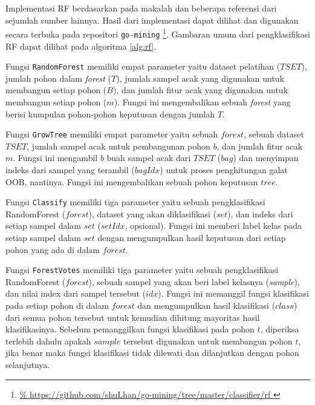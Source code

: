 Implementasi RF berdasarkan pada makalah \textcite{breiman2001random}
dan beberapa referensi dari sejumlah sumber lainnya.
Hasil dari implementasi dapat dilihat dan digunakan secara terbuka pada
repositori \texttt{go-mining}
\footnote{
\url{%
https://github.com/shuLhan/go-mining/tree/master/classifier/rf
}}.
Gambaran umum dari pengklasifikasi RF dapat dilihat pada algoritma
\ref{alg:rf}.

	

Fungsi \texttt{RandomForest} memiliki empat parameter yaitu dataset pelatihan
($TSET$),
jumlah pohon dalam \textit{forest} ($T$), jumlah sampel acak yang digunakan untuk
membangun setiap pohon ($B$), dan jumlah fitur acak yang digunakan untuk membangun
setiap pohon ($m$).
Fungsi ini mengembalikan sebuah \textit{forest} yang berisi kumpulan
pohon-pohon keputusan dengan jumlah $T$.

Fungsi \texttt{GrowTree} memiliki empat parameter yaitu sebuah $forest$, sebuah
dataset $TSET$, jumlah sampel acak untuk pembangunan pohon $b$, dan jumlah
fitur acak $m$.
Fungsi ini mengambil $b$ buah sampel acak dari $TSET$ ($bag$) dan menyimpan
indeks dari sampel yang terambil ($bagIdx$) untuk proses penghitungan galat
OOB, nantinya.
Fungsi ini mengembalikan sebuah pohon keputusan $tree$.

Fungsi \texttt{Classify} memiliki tiga parameter yaitu sebuah pengklasifikasi
RandomForest ($forest$), dataset yang akan diklasifikasi ($set$), dan indeks
dari setiap sampel dalam $set$ ($setIdx$, opsional).
Fungsi ini memberi label kelas pada setiap sampel dalam $set$ dengan
mengumpulkan hasil keputusan dari setiap pohon yang ada di dalam $forest$.

Fungsi \texttt{ForestVotes} memiliki tiga parameter yaitu sebuah
pengklasifikasi RandomForest ($forest$), sebuah sampel yang akan beri label
kelasnya (\textit{sample}), dan nilai index dari sampel tersebut ($idx$).
Fungsi ini memanggil fungsi klasifikasi pada setiap pohon di dalam $forest$ dan
mengumpulkan hasil klasifikasi ($class$) dari semua pohon tersebut untuk
kemudian dihitung mayoritas hasil klasifikasinya.
Sebelum pemanggilkan fungsi klasifikasi pada pohon $t$, diperiksa terlebih
dahulu apakah $sample$ tersebut digunakan untuk membangun pohon $t$, jika benar
maka fungsi klasifikasi tidak dilewati dan dilanjutkan dengan pohon
selanjutnya.
